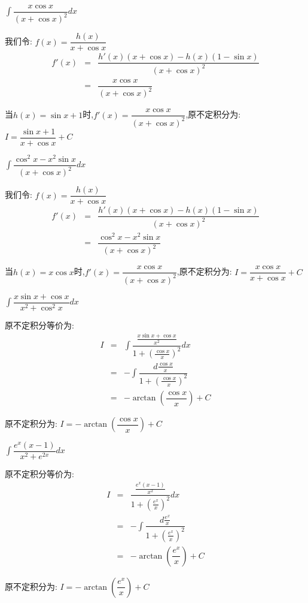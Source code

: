 \begin{proposition}
	$\int \dfrac{x\cos x}{(x+\cos x)^2}dx$
\end{proposition}
\begin{solution}
		
	我们令:  $f(x)=\dfrac{h(x)}{x+\cos x}$
	\begin{eqnarray*}
		f'(x)&=&\dfrac{h'(x)(x+\cos x)-h(x)(1-\sin x)}{(x+\cos x)^2}\\
		&=&\dfrac{x\cos x}{(x+\cos x)^2}
	\end{eqnarray*}
	
	当$h(x)=\sin x+1$时,$f'(x)=\dfrac{x\cos x}{(x+\cos x)^2}$,原不定积分为:  $I=\dfrac{\sin x+1}{x+\cos x}+C$
\end{solution}
\begin{proposition}
	$\int \dfrac{\cos^2x-x^2\sin x}{(x+\cos x)^2}dx$
\end{proposition}
\begin{solution}
		
	我们令:  $f(x)=\dfrac{h(x)}{x+\cos x}$
	\begin{eqnarray*}
		f'(x)&=&\dfrac{h'(x)(x+\cos x)-h(x)(1-\sin x)}{(x+\cos x)^2}\\
		&=&\dfrac{\cos^2x-x^2\sin x}{(x+\cos x)^2}
	\end{eqnarray*}
	
	当$h(x)=x\cos x$时,$f'(x)=\dfrac{x\cos x}{(x+\cos x)^2}$,原不定积分为:  $I=\dfrac{x\cos x}{x+\cos x}+C$
\end{solution}
\begin{proposition}
	$\int \dfrac{x\sin x+\cos x}{x^2+\cos^2x}dx$
\end{proposition}
\begin{solution}
		
	原不定积分等价为:  
	\begin{eqnarray*}
		I&=&\int \dfrac{\frac{x\sin x+\cos x}{x^2}}{1+\left( \frac{\cos x}{x}\right)^2}dx\\
		&=&-\int \dfrac{d\frac{\cos x}{x}}{1+\left( \frac{\cos x}{x}\right)^2}\\
		&=&-\arctan(\dfrac{\cos x}{x})+C
	\end{eqnarray*}

	原不定积分为:  $I=-\arctan(\dfrac{\cos x}{x})+C$
\end{solution}
\begin{proposition}
	$\int \dfrac{e^x(x-1)}{x^2+e^{2x}}dx$
\end{proposition}
\begin{solution}
		
	原不定积分等价为:  
	\begin{eqnarray*}
		I&=&\dfrac{\frac{e^x(x-1)}{x^2}}{1+\left(\frac{e^x}{x}\right)^2}dx\\
		&=&-\int \dfrac{d\frac{e^x}{x}}{1+\left( \frac{e^x}{x}\right)^2}\\
		&=&-\arctan(\dfrac{e^x}{x})+C
	\end{eqnarray*}
	
	原不定积分为:  $I=-\arctan(\dfrac{e^x}{x})+C$
\end{solution}
